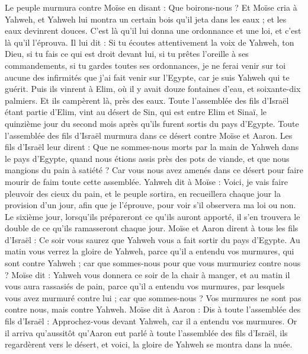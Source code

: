 \begin{multicols}{2}
Le peuple murmura contre Moïse en disant : Que boirons-nous ?
Et Moïse cria à Yahweh, et Yahweh lui montra un certain bois qu'il jeta dans les eaux ; et les eaux devinrent douces. C'est là qu'il lui donna une ordonnance et une loi, et c'est là qu'il l'éprouva.
Il lui dit : Si tu écoutes attentivement la voix de Yahweh, ton Dieu, si tu fais ce qui est droit devant lui, si tu prêtes l'oreille à ses commandements, si tu gardes toutes ses ordonnances, je ne ferai venir sur toi aucune des infirmités que j'ai fait venir sur l'Egypte, car je suis Yahweh qui te guérit.
Puis ils vinrent à Elim, où il y avait douze fontaines d'eau, et soixante-dix palmiers. Et ils campèrent là, près des eaux.
\VerseOne{}Toute l'assemblée des fils d'Israël étant partie d'Elim, vint au désert de Sin, qui est entre Elim et Sinaï, le quinzième jour du second mois après qu'ils furent sortis du pays d'Egypte.
Toute l'assemblée des fils d'Israël murmura dans ce désert contre Moïse et Aaron.
Les fils d'Israël leur dirent : Que ne sommes-nous morts par la main de Yahweh dans le pays d'Egypte, quand nous étions assis près des pots de viande, et que nous mangions du pain à satiété ? Car vous nous avez amenés dans ce désert pour faire mourir de faim toute cette assemblée.
Yahweh dit à Moïse : Voici, je vais faire pleuvoir des cieux du pain, et le peuple sortira, en recueillera chaque jour la provision d'un jour, afin que je l'éprouve, pour voir s'il observera ma loi ou non.
Le sixième jour, lorsqu’ils prépareront ce qu’ils auront apporté, il s’en trouvera le double de ce qu’ils ramasseront chaque jour.
Moïse et Aaron dirent à tous les fils d'Israël : Ce soir vous saurez que Yahweh vous a fait sortir du pays d'Egypte.
Au matin vous verrez la gloire de Yahweh, parce qu'il a entendu vos murmures, qui sont contre Yahweh ; car que sommes-nous pour que vous murmuriez contre nous ?
Moïse dit : Yahweh vous donnera ce soir de la chair à manger, et au matin il vous aura rassasiés de pain, parce qu'il a entendu vos murmures, par lesquels vous avez murmuré contre lui ; car que sommes-nous ? Vos murmures ne sont pas contre nous, mais contre Yahweh.
Moïse dit à Aaron : Dis à toute l'assemblée des fils d'Israël : Approchez-vous devant Yahweh, car il a entendu vos murmures.
Or il arriva qu'aussitôt qu'Aaron eut parlé à toute l'assemblée des fils d'Israël, ils regardèrent vers le désert, et voici, la gloire de Yahweh se montra dans la nuée.

\end{multicols}
